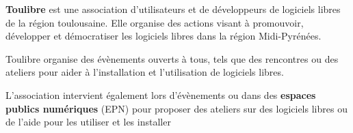 
\textbf{Toulibre} est une association d'utilisateurs et de développeurs de logiciels libres de la région toulousaine. Elle organise des actions visant à promouvoir, développer et démocratiser les logiciels libres dans la région Midi-Pyrénées.

\Separateur

Toulibre organise des évènements ouverts à tous, tels que des rencontres ou des ateliers pour aider à l'installation et l'utilisation de logiciels libres.

L'association intervient également lors d'évènements ou dans des \textbf{espaces publics numériques} (EPN) pour proposer des ateliers sur des logiciels libres ou de l'aide pour les utiliser et les installer
